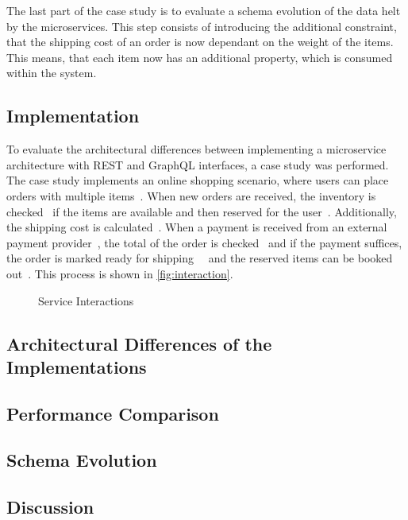 The last part of the case study is to evaluate a schema evolution of the data helt by the microservices.
This step consists of introducing the additional constraint, that the shipping cost of an order is now dependant on the weight of the items.
This means, that each item now has an additional property, which is consumed within the system.

\subsection{Implementation}

To evaluate the architectural differences between implementing a microservice architecture with REST and GraphQL interfaces, a case study was performed.
The case study implements an online shopping scenario, where users can place orders with multiple items~\raisebox{.5pt}{\textcircled{\raisebox{-.9pt} {1}}}.
When new orders are received, the inventory is checked~\raisebox{.5pt}{\textcircled{\raisebox{-.9pt} {2}}} if the items are available and then reserved for the user~\raisebox{.5pt}{\textcircled{\raisebox{-.9pt} {3}}}.
Additionally, the shipping cost is calculated~\raisebox{.5pt}{\textcircled{\raisebox{-.9pt} {4}}}.
When a payment is received from an external payment provider~\raisebox{.5pt}{\textcircled{\raisebox{-.9pt} {5}}}, the total of the order is checked~\raisebox{.5pt}{\textcircled{\raisebox{-.9pt} {6}}} and if the payment suffices, the order is marked ready for shipping~\raisebox{.5pt}{\textcircled{\raisebox{-.9pt} {7}}}~\raisebox{.5pt}{\textcircled{\raisebox{-.9pt} {8}}} and the reserved items can be booked out~\raisebox{.5pt}{\textcircled{\raisebox{-.9pt} {9}}}.
This process is shown in \autoref{fig:interaction}.

\begin{figure}[!htb]
    \centering
    
    \caption{Service Interactions}
    \label{fig:interaction}
\end{figure}

\subsection{Architectural Differences of the Implementations}

\subsection{Performance Comparison}

\subsection{Schema Evolution}

\subsection{Discussion}